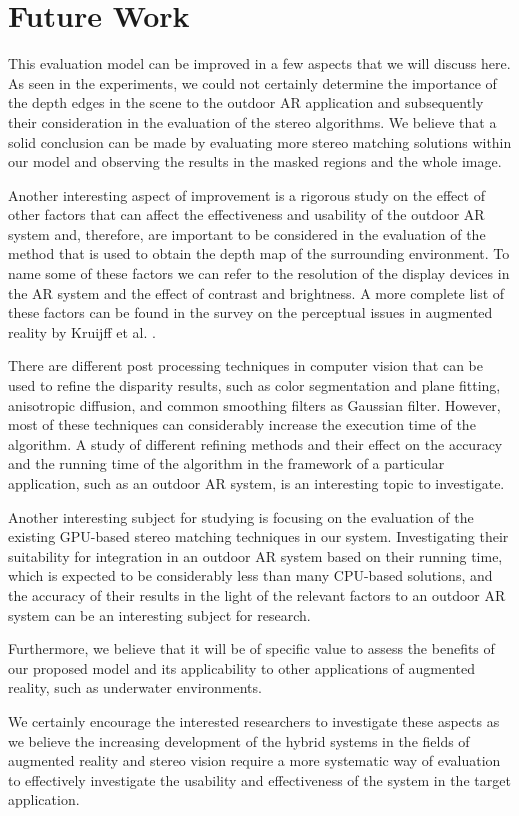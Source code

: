 \section{Future Work}
This evaluation model can be improved in a few aspects that we will discuss here.
As seen in the experiments, we could not certainly determine the importance of the depth edges in the scene to the outdoor AR application and subsequently their consideration in the evaluation 
of the stereo algorithms. We believe that a solid conclusion can be made by evaluating more stereo matching solutions
within our model and observing the results in the masked regions and the whole image.

Another interesting aspect of improvement is a rigorous study on the effect of other factors that can affect the effectiveness and usability of the outdoor AR system and, therefore, 
are important to be considered in the evaluation of the method that is used to obtain the depth map of the surrounding environment. 
To name some of these factors we can refer to
the resolution of the display devices in the AR system and the effect of contrast and brightness. A more complete list of these factors can be
found in the survey on the perceptual issues in augmented reality by Kruijff et al. \cite{kru10}.

There are different post processing techniques in computer vision that can be used to refine the disparity results, such as color segmentation and plane fitting, 
anisotropic diffusion, and common smoothing filters as Gaussian filter. However, most of these techniques can considerably increase the execution time of the algorithm.
A study of different refining methods and their effect on the accuracy and the running time of the algorithm in the framework of a particular application, 
such as an outdoor AR system, is an interesting topic to investigate.

Another interesting subject for studying is focusing on the evaluation of the existing GPU-based stereo matching techniques in our system.
Investigating their suitability for integration in an outdoor AR system based on their running time, which is expected to be considerably less than many CPU-based solutions, 
and the accuracy of their results in the light of the relevant factors to an outdoor AR system can be an interesting subject for research.

Furthermore, we believe that it will be of specific value to
assess the benefits of our proposed model and its applicability to other applications of augmented reality, such as underwater environments. 

We certainly encourage the 
interested researchers to investigate these aspects as we believe the increasing development of the hybrid systems in the fields of augmented reality and stereo vision 
require a more systematic way of evaluation to effectively investigate the usability and effectiveness of the system in the target application.



